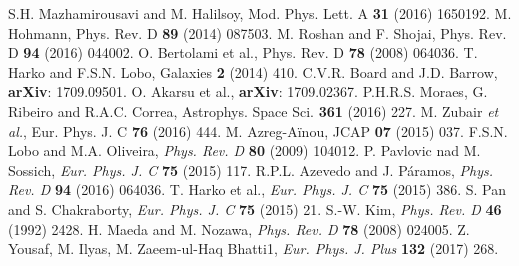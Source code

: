 \documentclass[twocolumn,showpacs,aps,amssymb,floatfix,prd,amsmath,preprintnumbers]{revtex4}
\begin{document}
\begin{references}
 S.H. Mazhamirousavi and M. Halilsoy, Mod. Phys. Lett. A {\bf 31} (2016) 1650192.
 M. Hohmann, Phys. Rev. D {\bf 89} (2014) 087503.
 M. Roshan and F. Shojai, Phys. Rev. D {\bf 94} (2016) 044002.
 O. Bertolami et al., Phys. Rev. D {\bf 78} (2008) 064036.
 T. Harko and F.S.N. Lobo, Galaxies {\bf 2} (2014) 410.
 C.V.R. Board and J.D. Barrow, {\bf arXiv}: 1709.09501.
 O. Akarsu et al., {\bf arXiv}: 1709.02367.
 P.H.R.S. Moraes, G. Ribeiro and R.A.C. Correa, Astrophys. Space Sci. {\bf 361} (2016) 227.
 M. Zubair {\it et al.}, Eur. Phys. J. C {\bf 76} (2016) 444.
 M. Azreg-A\"{i}nou, JCAP {\bf 07} (2015) 037.
 F.S.N. Lobo and M.A. Oliveira, {\it Phys. Rev. D} {\bf 80} (2009) 104012.
 P. Pavlovic nad M. Sossich, {\it Eur. Phys. J. C} {\bf 75} (2015) 117. 
 R.P.L. Azevedo and J. P\'aramos, {\it Phys. Rev. D} {\bf 94} (2016) 064036.
 T. Harko et al., {\it Eur. Phys. J. C} {\bf 75} (2015) 386.
 S. Pan and S. Chakraborty, {\it Eur. Phys. J. C} {\bf 75} (2015) 21.
 S.-W. Kim, {\it Phys. Rev. D} {\bf 46} (1992) 2428.
 H. Maeda and M. Nozawa, {\it Phys. Rev. D} {\bf 78} (2008) 024005.
 Z. Yousaf, M. Ilyas, M. Zaeem-ul-Haq Bhatti1, {\it Eur. Phys. J. Plus} {\bf 132} (2017) 268.


\end{references}
\end{document}

